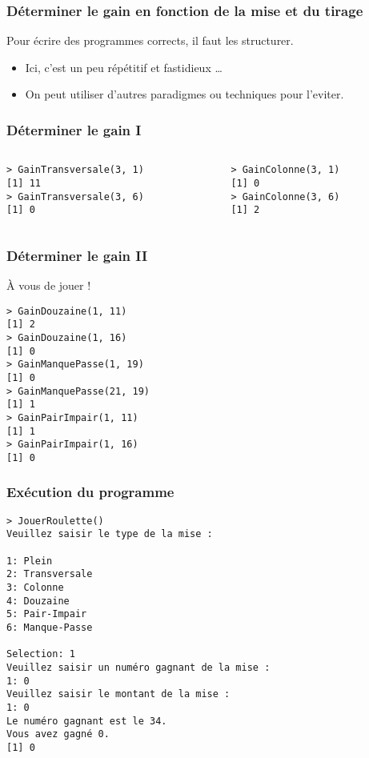\documentclass[10pt]{beamer}
\begin{document}
\begin{frame}[fragile]
  \frametitle{Déterminer le gain en fonction de la mise et du tirage}
  Pour écrire des programmes corrects, il faut les structurer.
  
  \begin{itemize}
  \item Ici, c'est un peu répétitif et fastidieux \dots
  \item On peut utiliser d'autres paradigmes ou techniques pour l'eviter.
  \end{itemize}

\end{frame}

\begin{frame}[fragile]
  \frametitle{Déterminer le gain I}
  

  
\begin{columns}[t]
\begin{column}{0.48\textwidth}
  \begin{lstlisting}
> GainTransversale(3, 1)
[1] 11
> GainTransversale(3, 6)
[1] 0
\end{lstlisting}
\end{column}
\begin{column}{0.48\textwidth}
  \begin{lstlisting}
> GainColonne(3, 1)
[1] 0
> GainColonne(3, 6)
[1] 2
  \end{lstlisting}
\end{column}
\end{columns}
\end{frame}
\begin{frame}[fragile]
  \frametitle{Déterminer le gain II}
  \begin{exampleblock}{À vous de jouer !}
    
  \end{exampleblock}
  \begin{lstlisting}
> GainDouzaine(1, 11)
[1] 2
> GainDouzaine(1, 16)
[1] 0
> GainManquePasse(1, 19)
[1] 0
> GainManquePasse(21, 19)
[1] 1
> GainPairImpair(1, 11)
[1] 1
> GainPairImpair(1, 16)
[1] 0
  \end{lstlisting}
\end{frame}

\begin{frame}[fragile]
  \frametitle{Exécution du programme}
  \begin{lstlisting}
> JouerRoulette()
Veuillez saisir le type de la mise :  

1: Plein
2: Transversale
3: Colonne
4: Douzaine
5: Pair-Impair
6: Manque-Passe

Selection: 1
Veuillez saisir un numéro gagnant de la mise :
1: 0
Veuillez saisir le montant de la mise :
1: 0
Le numéro gagnant est le 34.
Vous avez gagné 0.
[1] 0
\end{lstlisting}

\end{frame}
\end{document}
